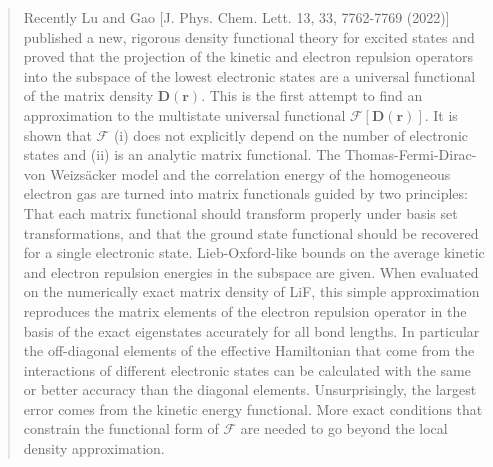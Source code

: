 \documentclass[journal=jpclcd,manuscript=letter]{achemso}
\newcommand\m[1]{\mathbf{#1}}
\renewcommand\vec[1]{\mathbf{#1}}
\begin{document}
\begin{abstract}
Recently Lu and Gao [J. Phys. Chem. Lett. 13, 33, 7762-7769 (2022)]
published a new, rigorous density functional theory for excited states and proved that the
projection of the kinetic and electron repulsion operators into the subspace of the lowest electronic states
are a universal functional of the matrix density $\m{D}(\vec{r})$.
This is the first attempt to find an approximation to the multistate universal functional $\m{\mathcal{F}}[\m{D}(\vec{r})]$.
It is shown that $\m{\mathcal{F}}$ (i) does not explicitly depend on the number of electronic states and (ii)
is an analytic matrix functional. 
The Thomas-Fermi-Dirac-von Weizs\"{a}cker model and the correlation energy of the homogeneous electron gas
are turned into matrix functionals guided by two principles: That each matrix functional should transform
properly under basis set transformations, and that the ground state functional should be recovered for a single electronic state.
Lieb-Oxford-like bounds on the average kinetic and electron repulsion energies in the subspace are given.
When evaluated on the numerically exact matrix density of LiF, this simple approximation
reproduces the matrix elements of the electron repulsion operator in the basis of the exact eigenstates accurately for all bond lengths.
In particular the off-diagonal elements of the effective Hamiltonian that come from the
interactions of different electronic states can be calculated with the same or better accuracy than the diagonal elements.
Unsurprisingly, the largest error comes from the kinetic energy functional.
More exact conditions that constrain the functional form of $\m{\mathcal{F}}$ are needed to go beyond the local density approximation.

%


\end{abstract}
\end{document}
